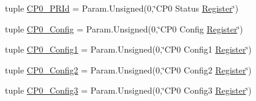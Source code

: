\begin{DoxyCompactItemize}
\item 
tuple \hyperlink{classMipsCPU_1_1BaseMipsCPU_a0a4089c6aacda5dd54c80fc8584cfdd7}{CP0\_\-PRId} = Param.Unsigned(0,\char`\"{}CP0 Status \hyperlink{classRegister}{Register}\char`\"{})
\item 
tuple \hyperlink{classMipsCPU_1_1BaseMipsCPU_abefb45ade026543d3f48560708ac3cb5}{CP0\_\-Config} = Param.Unsigned(0,\char`\"{}CP0 Config \hyperlink{classRegister}{Register}\char`\"{})
\item 
tuple \hyperlink{classMipsCPU_1_1BaseMipsCPU_a41aef9d5fed85db3e8cbacaed6122566}{CP0\_\-Config1} = Param.Unsigned(0,\char`\"{}CP0 Config1 \hyperlink{classRegister}{Register}\char`\"{})
\item 
tuple \hyperlink{classMipsCPU_1_1BaseMipsCPU_a8469209fa548a8b86a04d0780ff8689e}{CP0\_\-Config2} = Param.Unsigned(0,\char`\"{}CP0 Config2 \hyperlink{classRegister}{Register}\char`\"{})
\item 
tuple \hyperlink{classMipsCPU_1_1BaseMipsCPU_ac0b6416224f47ab3b4d1e049034e1ecc}{CP0\_\-Config3} = Param.Unsigned(0,\char`\"{}CP0 Config3 \hyperlink{classRegister}{Register}\char`\"{})
\end{DoxyCompactItemize}


